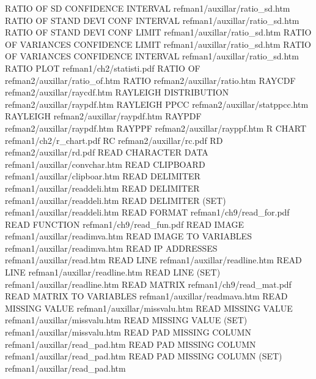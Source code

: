 RATIO OF SD CONFIDENCE INTERVAL         refman1/auxillar/ratio_sd.htm
RATIO OF STAND DEVI CONF INTERVAL       refman1/auxillar/ratio_sd.htm
RATIO OF STAND DEVI CONF LIMIT          refman1/auxillar/ratio_sd.htm
RATIO OF VARIANCES CONFIDENCE LIMIT     refman1/auxillar/ratio_sd.htm
RATIO OF VARIANCES CONFIDENCE INTERVAL  refman1/auxillar/ratio_sd.htm
RATIO PLOT                              refman1/ch2/statisti.pdf
RATIO OF                                refman2/auxillar/ratio_of.htm
RATIO                                   refman2/auxillar/ratio.htm
RAYCDF                                  refman2/auxillar/raycdf.htm
RAYLEIGH DISTRIBUTION                   refman2/auxillar/raypdf.htm
RAYLEIGH PPCC                           refman2/auxillar/statppcc.htm
RAYLEIGH                                refman2/auxillar/raypdf.htm
RAYPDF                                  refman2/auxillar/raypdf.htm
RAYPPF                                  refman2/auxillar/rayppf.htm
R CHART                                 refman1/ch2/r_chart.pdf
RC                                      refman2/auxillar/rc.pdf
RD                                      refman2/auxillar/rd.pdf
READ CHARACTER DATA                     refman1/auxillar/convchar.htm
READ CLIPBOARD                          refman1/auxillar/clipboar.htm
READ DELIMITER                          refman1/auxillar/readdeli.htm
READ DELIMITER                          refman1/auxillar/readdeli.htm
READ DELIMITER (SET)                    refman1/auxillar/readdeli.htm
READ FORMAT                             refman1/ch9/read_for.pdf
READ FUNCTION                           refman1/ch9/read_fun.pdf
READ IMAGE                              refman1/auxillar/readimva.htm
READ IMAGE TO VARIABLES                 refman1/auxillar/readimva.htm
READ IP ADDRESSES                       refman1/auxillar/read.htm
READ LINE                               refman1/auxillar/readline.htm
READ LINE                               refman1/auxillar/readline.htm
READ LINE (SET)                         refman1/auxillar/readline.htm
READ MATRIX                             refman1/ch9/read_mat.pdf
READ MATRIX TO VARIABLES                refman1/auxillar/readmava.htm
READ MISSING VALUE                      refman1/auxillar/missvalu.htm
READ MISSING VALUE                      refman1/auxillar/missvalu.htm
READ MISSING VALUE (SET)                refman1/auxillar/missvalu.htm
READ PAD MISSING COLUMN                 refman1/auxillar/read_pad.htm
READ PAD MISSING COLUMN                 refman1/auxillar/read_pad.htm
READ PAD MISSING COLUMN (SET)           refman1/auxillar/read_pad.htm
